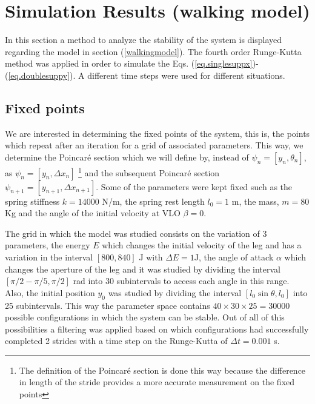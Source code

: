 \section{Simulation Results (walking model)}\label{simulation}
In this section a method to analyze the stability of the system is displayed regarding the model in section (\ref{walkingmodel}). The fourth order Runge-Kutta method \cite{runge} was applied in order to simulate the Eqs. (\ref{eq.singlesuppx})-(\ref{eq.doublesuppy}). A different time steps were  used for different situations.
\subsection{Fixed points}\label{pontosfixos}
We are interested in determining the fixed points of the system, this is, the points which repeat after an iteration for a grid of associated parameters. This way, we determine the Poincaré section which we will define by, instead of $\psi_n=[y_n,\theta_n]$, as  $\psi_n=[y_n,\Delta x_n]$ \footnote{The definition of the Poincaré section is done this way because the difference in length of the stride provides a more accurate measurement on  the fixed points} and the subsequent Poincaré section $\psi_{n+1}=[y_{n+1},\Delta x_{n+1}]$. Some of the parameters were kept fixed such as the spring stiffness $k=14000$ N/m, the spring rest length $l_0=1$ m, the mass, $m=80$ Kg and the angle of the initial velocity at VLO $\beta=0$.

The grid in which the model was studied consists on the variation of 3 parameters, the energy $E$  which changes the initial velocity of the leg and has a variation in the interval $[800,840]$ J with $\Delta E = 1$J, the angle of attack $\alpha$ which changes the aperture of the leg and it was studied by dividing the interval $[\pi/2-\pi/5,\pi/2]$ rad into 30 subintervals to access each angle in this range. Also, the initial position $y_0$ was studied by dividing the interval $[l_0 \sin{\theta}, l_0]$ into 25 subintervals. This way the parameter space contains $40 \times 30 \times 25 = 30000$ possible configurations in which the system can be stable. Out of all of this possibilities a filtering was applied based on which configurations had successfully completed 2 strides with a time step on the Runge-Kutta of $\Delta t= 0.001$ s.

